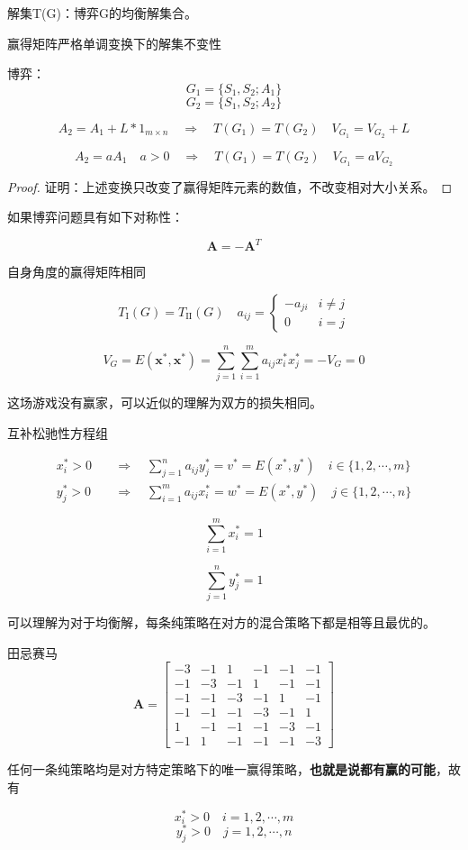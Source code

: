 \documentclass[12pt, a4paper, oneside, UTF8]{ctexbook}
\begin{document}
解集T(G)：博弈G的均衡解集合。

赢得矩阵严格单调变换下的解集不变性

博弈：
\[ G_1 = \{S_1, S_2; A_1\} \]
\[ G_2 = \{S_1, S_2; A_2\} \]

\[ A_2 = A_1 + L * 1_{m \times n} \quad \Longrightarrow \quad T(G_1) = T(G_2) \quad V_{G_1} = V_{G_2} + L \]

\[ A_2 = aA_1 \quad a > 0 \quad \Longrightarrow \quad T(G_1) = T(G_2) \quad V_{G_1} = aV_{G_2} \]

\begin{proof}
    证明：上述变换只改变了赢得矩阵元素的数值，不改变相对大小关系。
\end{proof}

如果博弈问题具有如下对称性：

\[ \mathbf{A} = -\mathbf{A}^T \]

自身角度的赢得矩阵相同

\[ T_{\text{I}}(G) = T_{\text{II}}(G) \quad a_{ij} = \begin{cases} 
-a_{ji} & i \neq j \\
0 & i = j 
\end{cases} \]

\[ V_G = E(\mathbf{x}^*, \mathbf{x}^*) = \sum_{j=1}^n \sum_{i=1}^m a_{ij} x_i^* x_j^* = -V_G = 0 \]

这场游戏没有赢家，可以近似的理解为双方的损失相同。

互补松驰性方程组

$$
\begin{aligned}
x_i^* > 0 & \quad \Rightarrow \quad \sum_{j=1}^n a_{ij} y_j^* = v^* = E(x^*, y^*) \quad i \in \{1, 2, \cdots, m\} \\
y_j^* > 0 & \quad \Rightarrow \quad \sum_{i=1}^m a_{ij} x_i^* = w^* = E(x^*, y^*) \quad j \in \{1, 2, \cdots, n\}
\end{aligned}
$$

$$
\sum_{i=1}^m x_i^* = 1
$$

$$
\sum_{j=1}^n y_j^* = 1
$$

可以理解为对于均衡解，每条纯策略在对方的混合策略下都是相等且最优的。

\begin{example}
    田忌赛马
    $$
\mathbf{A} = \begin{bmatrix}
-3 & -1 & 1 & -1 & -1 & -1 \\
-1 & -3 & -1 & 1 & -1 & -1 \\
-1 & -1 & -3 & -1 & 1 & -1 \\
-1 & -1 & -1 & -3 & -1 & 1 \\
1 & -1 & -1 & -1 & -3 & -1 \\
-1 & 1 & -1 & -1 & -1 & -3
\end{bmatrix}
$$

任何一条纯策略均是对方特定策略下的唯一赢得策略，\textbf{也就是说都有赢的可能}，故有

$$
x_i^* > 0 \quad i = 1, 2, \cdots, m
$$
$$
y_j^* > 0 \quad j = 1, 2, \cdots, n
$$
\end{example}
\end{document}
